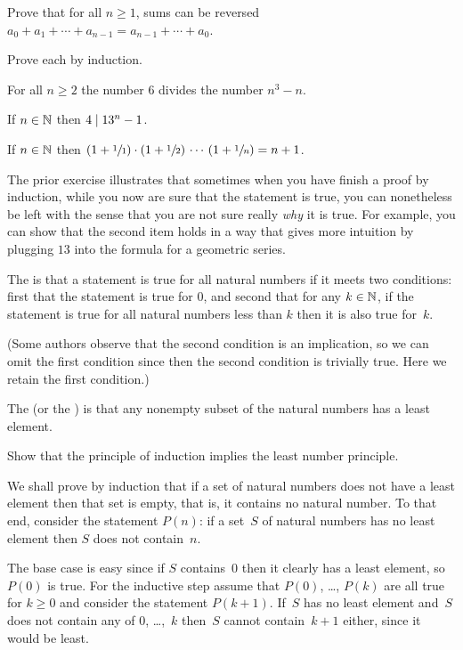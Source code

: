 \documentclass{ibl}
\begin{document}
\begin{ex}
Prove that for all $n\geq 1$, sums can be reversed
$a_0+a_1+\cdots+a_{n-1}=a_{n-1}+\cdots+a_0$.   
\end{ex}

\begin{ex}
Prove each by induction.
\begin{exes}
\item For all $n\geq 2$ the number $6$ divides the number $n^3-n$.
\item If $n\in\mathbb{N}$ then $4\mid 13^n-1$.
\item If $n\in\mathbb{N}$ then
    $(1+\sfrac{1}{1})\cdot(1+\sfrac{1}{2})\,\cdots\,(1+\sfrac{1}{n})=n+1$.
\end{exes}
\end{ex}

The prior exercise illustrates that 
sometimes when you have finish a proof by induction, 
while you now are sure that the statement is true, 
you can nonetheless be left with the sense
that you are not sure really \emph{why} it is true.
For example, you can show that the second item holds in a 
way that gives more intuition by plugging $13$ into the formula for a
geometric series. 

\begin{df}
The  is that a
statement is true for all natural numbers if it
meets two conditions: first that the statement is true for $0$,
and second that for any $k\in\mathbb{N}$, if the statement is true for 
all natural numbers less than $k$ then it is also true for~$k$.  
\end{df}

\noindent (Some authors observe that the second condition is an implication, 
so we can omit the first condition since then the second condition 
is trivially true.
Here we retain the first condition.)

\begin{df}
The  
(or the )
is that any nonempty 
subset of the natural
numbers has a least element.  
\end{df}

\begin{ex}
Show that the principle of induction implies the least number 
principle.
\begin{ans}
We shall prove by induction that if a set of natural numbers does not
have a least element then that set is empty, that is, it contains no 
natural number.
To that end, consider the statement $P(n)$: if a set~$S$ 
of natural numbers has no
least element then $S$ does not contain~$n$.

The base case is easy since if $S$ contains~$0$ then it clearly has a 
least element, so $P(0)$ is true.
For the inductive step assume that $P(0)$, \ldots, $P(k)$ are all true
for $k\geq 0$ and consider the statement $P(k+1)$.
If~$S$ has no least element and~$S$ does not contain any of $0$, \ldots,~$k$ 
then~$S$ cannot contain~$k+1$ either, since it would be least.   
\end{ans}
\end{ex}
\end{document}
